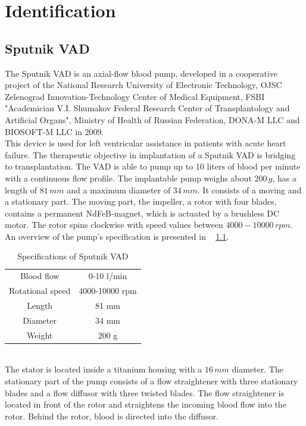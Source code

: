 \chapter{Identification}
\section{Sputnik VAD}\label{Sputnik}
The Sputnik VAD is an axial-flow blood pump, developed in a cooperative project of the National Research University of Electronic Technology, OJSC Zelenograd Innovation-Technology Center of Medical Equipment, FSBI "Academician V.I. Shumakov Federal Research Center of Transplantology and Artificial Organs", Ministry of Health of Russian Federation, DONA-M LLC and BIOSOFT-M LLC in 2009. \cite{Sputnik1}
\\This device is used for left ventricular assistance in patients with acute heart failure. The therapeutic objective in implantation of a Sputnik VAD is bridging to transplantation. The VAD is able to pump up to 10 liters of blood per minute with a continuous flow profile. The implantable pump weighs about $200\, g$, has a length of $81\, mm$ and a maximum diameter of $34\, mm$. It consists of a moving and a stationary part. The moving part, the impeller, a rotor with four blades, contains a permanent NdFeB-magnet, which is actuated by a brushless DC motor. The rotor spins clockwise with speed values between $4000-10000\, rpm$. An overview of the pump's specification is presented in \tablename~ \ref{tab:sput1}.
\begin{table}[ht]
  \centering
  \begin{tabular}{c|c}
    \toprule
    Blood flow  & 0-10 l/min \\
    Rotational speed & 4000-10000 rpm \\
    Length & 81 mm \\
    Diameter & 34 mm \\
    Weight & 200 g \\
    \bottomrule
\end{tabular}
  \caption[Specifications of Sputnik VAD]{Specifications of Sputnik VAD}
  \label{tab:sput1}
\end{table}
\\The stator is located inside a titanium housing with a $16\, mm$ diameter. The stationary part of the pump consists of a flow straightener with three stationary blades and a flow diffusor with three twisted blades. The flow straightener is located in front of the rotor and straightens the incoming blood flow into the rotor. Behind the rotor, blood is directed into the diffusor. %
